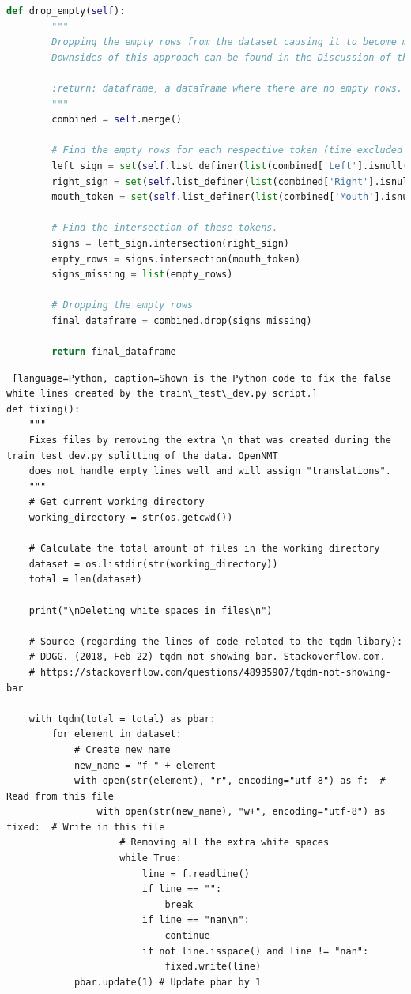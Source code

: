 \begin{lstlisting}[language=Python, caption=Shown is the Python code to merge the multiple CSV-files into one DataFrame.]
    def drop_empty(self):
        """
        Dropping the empty rows from the dataset causing it to become more information packed.
        Downsides of this approach can be found in the Discussion of the written Thesis.

        :return: dataframe, a dataframe where there are no empty rows.
        """
        combined = self.merge()

        # Find the empty rows for each respective token (time excluded since it is always present).
        left_sign = set(self.list_definer(list(combined['Left'].isnull().values)))
        right_sign = set(self.list_definer(list(combined['Right'].isnull().values)))
        mouth_token = set(self.list_definer(list(combined['Mouth'].isnull().values)))

        # Find the intersection of these tokens.
        signs = left_sign.intersection(right_sign)
        empty_rows = signs.intersection(mouth_token)
        signs_missing = list(empty_rows)

        # Dropping the empty rows
        final_dataframe = combined.drop(signs_missing)

        return final_dataframe
\end{lstlisting}
 \break
{} \label{apx:fixing}
\begin{lstlisting} [language=Python, caption=Shown is the Python code to fix the false white lines created by the train\_test\_dev.py script.]
def fixing():
    """
    Fixes files by removing the extra \n that was created during the train_test_dev.py splitting of the data. OpenNMT
    does not handle empty lines well and will assign "translations".
    """
    # Get current working directory
    working_directory = str(os.getcwd())

    # Calculate the total amount of files in the working directory
    dataset = os.listdir(str(working_directory))
    total = len(dataset)

    print("\nDeleting white spaces in files\n")

    # Source (regarding the lines of code related to the tqdm-libary):
    # DDGG. (2018, Feb 22) tqdm not showing bar. Stackoverflow.com.
    # https://stackoverflow.com/questions/48935907/tqdm-not-showing-bar

    with tqdm(total = total) as pbar:
        for element in dataset:
            # Create new name
            new_name = "f-" + element
            with open(str(element), "r", encoding="utf-8") as f:  # Read from this file
                with open(str(new_name), "w+", encoding="utf-8") as fixed:  # Write in this file
                    # Removing all the extra white spaces
                    while True:
                        line = f.readline()
                        if line == "":
                            break
                        if line == "nan\n":
                            continue
                        if not line.isspace() and line != "nan":
                            fixed.write(line)
            pbar.update(1) # Update pbar by 1
\end{lstlisting}

